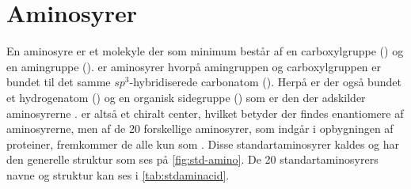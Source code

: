 \section{Aminosyrer}
En aminosyre er et molekyle der som minimum består af en carboxylgruppe () og en amingruppe ()\footnotemark{}.
 er aminosyrer hvorpå amingruppen og carboxylgruppen er bundet til det samme $sp^3$-hybridiserede carbonatom ().
Herpå er der også bundet et hydrogenatom () og en organisk sidegruppe () som er den der adskilder aminosyrerne \parencite{aminoBrit}.
 er altså et chiralt center,\footnotemark{} hvilket betyder der findes enantiomere af aminosyrerne, men af de 20 forskellige aminosyrer, som indgår i opbygningen af proteiner, fremkommer de alle kun som  \parencite{basisA}.
Disse standartaminosyrer kaldes  og har den generelle struktur som ses på \cref{fig:std-amino}.
De 20 standartaminosyrers navne og struktur kan ses i \cref{tab:stdaminacid}.
